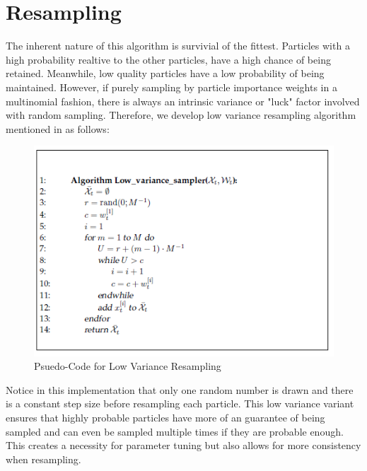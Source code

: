\documentclass[12pt, a4paper]{article}
\begin{document}
\section{Resampling}
The inherent nature of this algorithm is survivial of the fittest. Particles with a high probability realtive to the other particles, have a high chance of being retained. Meanwhile, low quality particles have a low probability of being maintained. However, if purely sampling by particle importance weights in a multinomial fashion, there is always an intrinsic variance or "luck" factor involved with random sampling. Therefore, we develop  low variance resampling algorithm mentioned in \cite{ProbRob} as follows:

\begin{figure}[H]
  \center
  \includegraphics{LowVarianceResampling.png}
  \caption{Psuedo-Code for Low Variance Resampling \cite{ProbRob}}
\end{figure}

\noindent Notice in this implementation that only one random number is drawn and there is a constant step size before resampling each particle. This low variance variant ensures that highly probable particles have more of an guarantee of being sampled and can even be sampled multiple times if they are probable enough. This creates a necessity for parameter tuning but also allows for more consistency when resampling.
\end{document}
